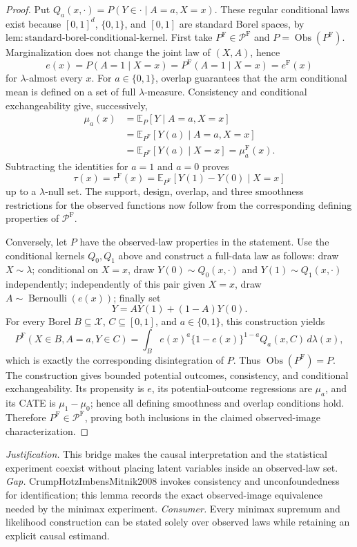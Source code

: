 \documentclass{article}
\begin{document}
\begin{proof}
Put \(Q_a(x,\cdot)=P(Y\in\cdot\mid A=a,X=x)\).  These regular conditional laws exist because \([0,1]^d\), \(\{0,1\}\), and \([0,1]\) are standard Borel spaces, by \(\mathrm{lem:standard\mbox{-}borel\mbox{-}conditional\mbox{-}kernel}\).  First take \(P^{\mathrm F}\in\mathcal P^{\mathrm F}\) and \(P=\operatorname{Obs}(P^{\mathrm F})\).  Marginalization does not change the joint law of \((X,A)\), hence
\[
 e(x)=P(A=1\mid X=x)=P^{\mathrm F}(A=1\mid X=x)=e^{\mathrm F}(x)
\]
for \(\lambda\)-almost every \(x\).  For \(a\in\{0,1\}\), overlap guarantees that the arm conditional mean is defined on a set of full \(\lambda\)-measure.  Consistency and conditional exchangeability give, successively,
\[
\begin{aligned}
 \mu_a(x)
 &=\mathbb E_P[Y\mid A=a,X=x]\\
 &=\mathbb E_{P^{\mathrm F}}[Y(a)\mid A=a,X=x]\\
 &=\mathbb E_{P^{\mathrm F}}[Y(a)\mid X=x]
 =\mu_a^{\mathrm F}(x).
\end{aligned}
\]
Subtracting the identities for \(a=1\) and \(a=0\) proves
\[
 \tau(x)=\tau^{\mathrm F}(x)
 =\mathbb E_{P^{\mathrm F}}[Y(1)-Y(0)\mid X=x]
\]
up to a \(\lambda\)-null set.  The support, design, overlap, and three smoothness restrictions for the observed functions now follow from the corresponding defining properties of \(\mathcal P^{\mathrm F}\).

Conversely, let \(P\) have the observed-law properties in the statement.  Use the conditional kernels \(Q_0,Q_1\) above and construct a full-data law as follows: draw \(X\sim\lambda\); conditional on \(X=x\), draw \(Y(0)\sim Q_0(x,\cdot)\) and \(Y(1)\sim Q_1(x,\cdot)\) independently; independently of this pair given \(X=x\), draw \(A\sim\operatorname{Bernoulli}(e(x))\); finally set
\[
 Y=A Y(1)+(1-A)Y(0).
\]
For every Borel \(B\subseteq\mathcal X\), \(C\subseteq[0,1]\), and \(a\in\{0,1\}\), this construction yields
\[
 P^{\mathrm F}(X\in B,A=a,Y\in C)
 =\int_B e(x)^a\{1-e(x)\}^{1-a}Q_a(x,C)\,d\lambda(x),
\]
which is exactly the corresponding disintegration of \(P\).  Thus \(\operatorname{Obs}(P^{\mathrm F})=P\).  The construction gives bounded potential outcomes, consistency, and conditional exchangeability.  Its propensity is \(e\), its potential-outcome regressions are \(\mu_a\), and its CATE is \(\mu_1-\mu_0\); hence all defining smoothness and overlap conditions hold.  Therefore \(P^{\mathrm F}\in\mathcal P^{\mathrm F}\), proving both inclusions in the claimed observed-image characterization.
\end{proof}
\par\smallskip\noindent \textit{Justification.} This bridge makes the causal interpretation and the statistical experiment coexist without placing latent variables inside an observed-law set. \textit{Gap.} CrumpHotzImbensMitnik2008 invokes consistency and unconfoundedness for identification; this lemma records the exact observed-image equivalence needed by the minimax experiment. \textit{Consumer.} Every minimax supremum and likelihood construction can be stated solely over observed laws while retaining an explicit causal estimand.
\end{document}
